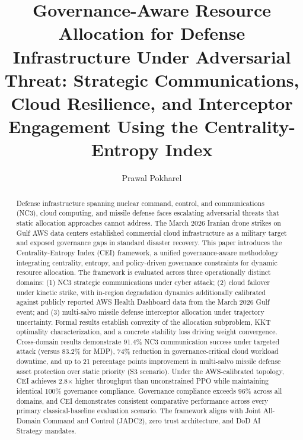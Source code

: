 \documentclass[runningheads]{llncs}
\begin{document}
\title{Governance-Aware Resource Allocation for Defense Infrastructure Under Adversarial Threat: Strategic Communications, Cloud Resilience, and Interceptor Engagement Using the Centrality-Entropy Index}


\author{Prawal Pokharel\orcidID{}}


\maketitle

\begin{abstract}
Defense infrastructure spanning nuclear command, control, and communications (NC3), cloud computing, and missile defense faces escalating adversarial threats that static allocation approaches cannot address. The March 2026 Iranian drone strikes on Gulf AWS data centers established commercial cloud infrastructure as a military target and exposed governance gaps in standard disaster recovery. This paper introduces the Centrality-Entropy Index (CEI) framework, a unified governance-aware methodology integrating centrality, entropy, and policy-driven governance constraints for dynamic resource allocation. The framework is evaluated across three operationally distinct domains: (1) NC3 strategic communications under cyber attack; (2) cloud failover under kinetic strike, with in-region degradation dynamics additionally calibrated against publicly reported AWS Health Dashboard data from the March 2026 Gulf event; and (3) multi-salvo missile defense interceptor allocation under trajectory uncertainty. Formal results establish convexity of the allocation subproblem, KKT optimality characterization, and a concrete stability loss driving weight convergence. Cross-domain results demonstrate 91.4\% NC3 communication success under targeted attack (versus 83.2\% for MDP), 74\% reduction in governance-critical cloud workload downtime, and up to 21 percentage points improvement in multi-salvo missile defense asset protection over static priority (S3 scenario). Under the AWS-calibrated topology, CEI achieves 2.8$\times$ higher throughput than unconstrained PPO while maintaining identical 100\% governance compliance. Governance compliance exceeds 96\% across all domains, and CEI demonstrates consistent comparative performance across every primary classical-baseline evaluation scenario. The framework aligns with Joint All-Domain Command and Control (JADC2), zero trust architecture, and DoD AI Strategy mandates.

\end{abstract}
\end{document}
